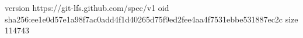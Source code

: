 version https://git-lfs.github.com/spec/v1
oid sha256:ee1e0d57e1a98f7ac0add4f1d40265d75f9ed2fee4aa4f7531ebbe531887ec2c
size 114743
